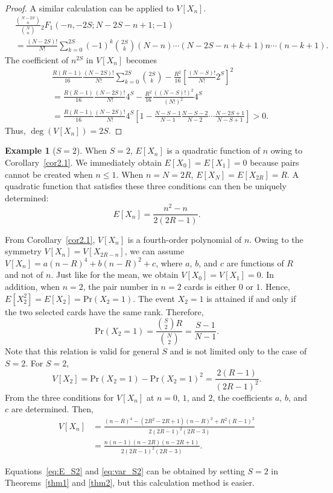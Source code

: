 \documentclass[pre, amsmath, floatfix]{revtex4-2}
\theoremstyle{plain}
\theoremstyle{definition}
\newtheorem{example}{Example}[section]
\theoremstyle{remark}
\newcommand{\Prob}[1]{\mathrm{Pr}\left(#1\right)} %
\newcommand{\E}[1]{E\left[#1\right]} %
\newcommand{\Var}[1]{V\left[#1\right]} %
\newcommand{\GaussFsymbol}{{}_2F_1} %
\newcommand{\GaussF}[4]{\GaussFsymbol\left(#1, #2; #3; #4\right)} %
\begin{document}
\begin{proof}
A similar calculation can be applied to $\Var{X_n}$.
\begin{align*}
&\frac{\binom{N-2S}{n}}{\binom{N}{n}}\GaussF{-n}{-2S}{N-2S-n+1}{-1}\\
&=\frac{(N-2S)!}{N!}\sum_{k=0}^{2S}(-1)^k\binom{2S}{k}(N-n)\cdots(N-2S-n+k+1)n\cdots(n-k+1).
\end{align*}
The coefficient of $n^{2S}$ in $\Var{X_n}$ becomes
\begin{align*}
&\frac{R(R-1)}{16}\frac{(N-2S)!}{N!}\sum_{k=0}^{2S}\binom{2S}{k}-\frac{R^2}{16}\left[\frac{(N-S)!}{N!}2^S\right]^2\\
&=\frac{R(R-1)}{16}\frac{(N-2S)!}{N!}4^S-\frac{R^2}{16}\frac{((N-S)!)^2}{(N!)^2}4^S\\
&=\frac{R(R-1)}{16}\frac{(N-2S)!}{N!}4^S\left[1-\frac{N-S-1}{N-1}\frac{N-S-2}{N-2}\cdots\frac{N-2S+1}{N-S+1}\right]>0.
\end{align*}
Thus, $\deg(\Var{X_n})=2S$.
\end{proof}

\begin{example}[$S=2$]\label{ex2.1}
When $S=2$, $\E{X_n}$ is a quadratic function of $n$ owing to Corollary~\ref{cor2.1}.
We immediately obtain $\E{X_0}=\E{X_1}=0$ because pairs cannot be created when $n\le1$.
When $n=N=2R$, $\E{X_N}=\E{X_{2R}}=R$.
A quadratic function that satisfies these three conditions can then be uniquely determined:
\begin{equation}
\E{X_n}=\frac{n^2-n}{2(2R-1)}.
\label{eq:E_S2}
\end{equation}

From Corollary~\ref{cor2.1}, $\Var{X_n}$ is a fourth-order polynomial of $n$.
Owing to the symmetry $\Var{X_n}=\Var{X_{2R-n}}$, we can assume $\Var{X_n}=a(n-R)^4+b(n-R)^2+c$, where $a$, $b$, and $c$ are functions of $R$ and not of $n$.
Just like for the mean, we obtain $\Var{X_0}=\Var{X_1}=0$.
In addition, when $n=2$, the pair number in $n=2$ cards is either $0$ or $1$.
Hence, $\E{X_2^2}=\E{X_2}=\Prob{X_2=1}$.
The event $X_2=1$ is attained if and only if the two selected cards have the same rank.
Therefore,
\begin{equation}
\Prob{X_2=1}=\frac{\binom{S}{2}R}{\binom{N}{2}}=\frac{S-1}{N-1}.
\label{eq:P_2}
\end{equation}
Note that this relation is valid for general $S$ and is not limited only to the case of $S=2$.
For $S=2$,
\[
\Var{X_2}=\Prob{X_2=1}-\Prob{X_2=1}^2=\frac{2(R-1)}{(2R-1)^2}.
\]
From the three conditions for $\Var{X_n}$ at $n=0$, $1$, and $2$, the coefficients $a$, $b$, and $c$ are determined.
Then, 
\begin{align}
\Var{X_n}&=\frac{(n-R)^4-(2R^2-2R+1)(n-R)^2+R^2(R-1)^2}{2(2R-1)^2(2R-3)}\nonumber\\
&=\frac{n(n-1)(n-2R)(n-2R+1)}{2(2R-1)^2(2R-3)}.
\label{eq:var_S2}
\end{align}

Equations~\eqref{eq:E_S2} and \eqref{eq:var_S2} can be obtained by setting $S=2$ in Theorems~\ref{thm1} and \ref{thm2}, but this calculation method is easier.
\end{example}
\end{document}
